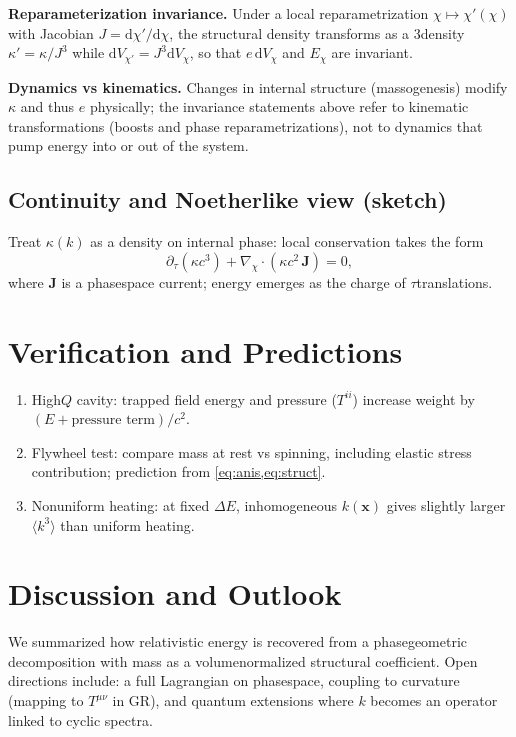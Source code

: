 \documentclass[11pt,a4paper]{article}
\newcommand{\dd}{\mathrm{d}}
\begin{document}
\textbf{Reparameterization invariance.} Under a local reparametrization $\chi\mapsto \chi'(\chi)$ with Jacobian $J=\dd\chi'/\dd\chi$, the structural density transforms as a 3\textendash density $\kappa' = \kappa/J^{3}$ while $\dd V_{\chi'} = J^{3}\dd V_{\chi}$, so that $e\,\dd V_{\chi}$ and $E_{\chi}$ are invariant.

\textbf{Dynamics vs kinematics.} Changes in internal structure (massogenesis) modify $\kappa$ and thus $e$ physically; the invariance statements above refer to kinematic transformations (boosts and phase reparametrizations), not to dynamics that pump energy into or out of the system.

\subsection{Continuity and Noether\textendash like view (sketch)}
Treat $\kappa(k)$ as a density on internal phase: local conservation takes the form
\begin{equation}
  \partial_\tau (\kappa c^3) + \nabla_{\chi}\!\cdot (\kappa c^2\,\bm{J}) = 0,
\end{equation}
where $\bm{J}$ is a phase\textendash space current; energy emerges as the charge of $\tau$\textendash translations.

\section{Verification and Predictions}
\begin{enumerate}
  \item High\textendash $Q$ cavity: trapped field energy and pressure ($T^{ii}$) increase weight by $(E+\text{pressure term})/c^2$.
  \item Flywheel test: compare mass at rest vs spinning, including elastic stress contribution; prediction from \cref{eq:anis,eq:struct}.
  \item Nonuniform heating: at fixed $\Delta E$, inhomogeneous $k(\bm{x})$ gives slightly larger $\langle k^3\rangle$ than uniform heating.
\end{enumerate}

\section{Discussion and Outlook}
We summarized how relativistic energy is recovered from a phase\textendash geometric decomposition with mass as a volume\textendash normalized structural coefficient. Open directions include: a full Lagrangian on phase\textendash space, coupling to curvature (mapping to $T^{\mu\nu}$ in GR), and quantum extensions where $k$ becomes an operator linked to cyclic spectra.
\end{document}
